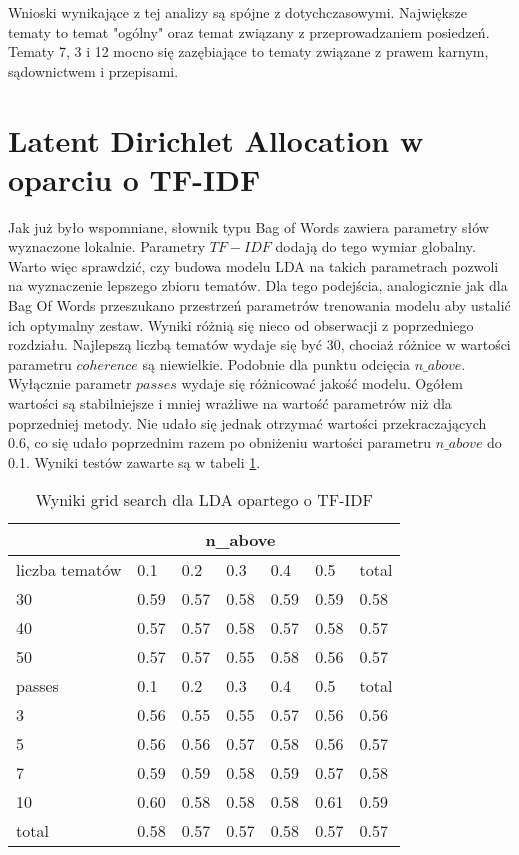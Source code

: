 \documentclass[a4paper,11pt,twoside]{report}
\theoremstyle{definition}
\begin{document}
Wnioski wynikające z tej analizy są spójne z dotychczasowymi. Największe tematy to temat "ogólny" oraz temat związany z przeprowadzaniem posiedzeń. Tematy 7, 3 i 12 mocno się zazębiające to tematy związane z prawem karnym, sądownictwem i przepisami.



\section{Latent Dirichlet Allocation w oparciu o TF-IDF}
Jak już było wspomniane, słownik typu Bag of Words zawiera parametry słów wyznaczone lokalnie. Parametry $TF-IDF$ dodają do tego wymiar globalny. Warto więc sprawdzić, czy budowa modelu LDA na takich parametrach pozwoli na wyznaczenie lepszego zbioru tematów.
Dla tego podejścia, analogicznie jak dla Bag Of Words przeszukano przestrzeń parametrów trenowania modelu aby ustalić ich optymalny zestaw. Wyniki różnią się nieco od obserwacji z poprzedniego rozdziału. Najlepszą liczbą tematów wydaje się być 30, chociaż różnice w wartości parametru $coherence$ są niewielkie. Podobnie dla punktu odcięcia $n\_above$. Wyłącznie parametr $passes$ wydaje się różnicować jakość modelu.  Ogółem wartości są stabilniejsze i mniej wrażliwe na wartość parametrów niż dla poprzedniej metody. Nie udało się jednak otrzymać wartości przekraczających 0.6, co się udało poprzednim razem po obniżeniu wartości parametru $n\_above$ do 0.1. Wyniki testów zawarte są w tabeli \ref{tab:gs03}.


\begin{table}  \centering
\begin{tabular}{ |p{2.5cm}||p{1.8cm}|p{1.8cm}|p{1.8cm}|p{1.8cm}|p{1.8cm}||p{1.8cm}| }
 \hline
      &  \multicolumn{5}{|c||}{n\_above} &    \\

 \hline
 liczba tematów & 0.1 & 0.2 & 0.3 & 0.4 & 0.5 & total \\
 \hline
30	 & 0.59 & 	0.57 & 	0.58 & 	0.59 & 	0.59 & 	0.58\\
40	 & 0.57 & 	0.57 & 	0.58 & 	0.57 & 	0.58 & 	0.57\\
50	 & 0.57 & 	0.57 & 	0.55 & 	0.58 & 	0.56 & 	0.57\\
 \hline \hline
passes & 0.1 & 0.2 & 0.3 & 0.4 & 0.5 & total \\
\hline
3 & 	0.56 & 	0.55 & 	0.55	 & 0.57	 & 0.56	 & 0.56\\
5 & 	0.56 & 	0.56 & 	0.57	 & 0.58	 & 0.56 & 	0.57\\
7 & 	0.59 & 	0.59 & 	0.58	 & 0.59	 & 0.57 & 	0.58\\
10	 & 0.60 & 	0.58 & 	0.58 & 	0.58	 & 0.61	 & 0.59\\
\hline \hline
total &		0.58 & 	0.57	 & 0.57 & 	0.58	 & 0.57 & 	0.57\\
\hline
\end{tabular} \caption{Wyniki grid search dla LDA opartego o TF-IDF} 
\label{tab:gs03}
\end{table}
\end{document}
